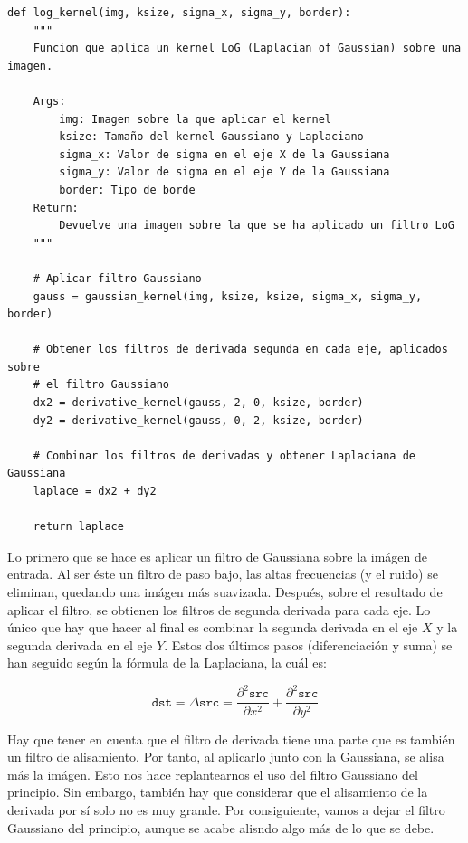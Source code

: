 \documentclass[11pt,a4paper]{article}
\begin{document}
\begin{lstlisting}[caption={Función que aplica una Laplaciana de Gaussiana.},label={alg:log-kernel}]
def log_kernel(img, ksize, sigma_x, sigma_y, border):
    """
    Funcion que aplica un kernel LoG (Laplacian of Gaussian) sobre una imagen.

    Args:
        img: Imagen sobre la que aplicar el kernel
        ksize: Tamaño del kernel Gaussiano y Laplaciano
        sigma_x: Valor de sigma en el eje X de la Gaussiana
        sigma_y: Valor de sigma en el eje Y de la Gaussiana
        border: Tipo de borde
    Return:
        Devuelve una imagen sobre la que se ha aplicado un filtro LoG
    """

    # Aplicar filtro Gaussiano
    gauss = gaussian_kernel(img, ksize, ksize, sigma_x, sigma_y, border)
    
    # Obtener los filtros de derivada segunda en cada eje, aplicados sobre
    # el filtro Gaussiano
    dx2 = derivative_kernel(gauss, 2, 0, ksize, border)
    dy2 = derivative_kernel(gauss, 0, 2, ksize, border)
    
    # Combinar los filtros de derivadas y obtener Laplaciana de Gaussiana
    laplace = dx2 + dy2

    return laplace
\end{lstlisting}

Lo primero que se hace es aplicar un filtro de Gaussiana sobre la imágen de entrada. Al ser éste un filtro de paso bajo, las
altas frecuencias (y el ruido) se eliminan, quedando una imágen más suavizada. Después, sobre el resultado de aplicar el
filtro, se obtienen los filtros de segunda derivada para cada eje. Lo único que hay que hacer al final es combinar la
segunda derivada en el eje $X$ y la segunda derivada en el eje $Y$. Estos dos últimos pasos (diferenciación y suma) se
han seguido según la fórmula de la Laplaciana, la cuál es:

\begin{equation}
\texttt{dst} = \Delta \texttt{src} = \frac{\partial^2 \texttt{src}}{\partial x^2} + \frac{\partial^2 \texttt{src}}{\partial y^2}
\end{equation}

Hay que tener en cuenta que el filtro de derivada tiene una parte que es también un filtro de alisamiento. Por tanto, al
aplicarlo junto con la Gaussiana, se alisa más la imágen. Esto nos hace replantearnos el uso del filtro Gaussiano del
principio. Sin embargo, también hay que considerar que el alisamiento de la derivada por sí solo no es muy grande. Por consiguiente,
vamos a dejar el filtro Gaussiano del principio, aunque se acabe alisndo algo más de lo que se debe.
\end{document}
